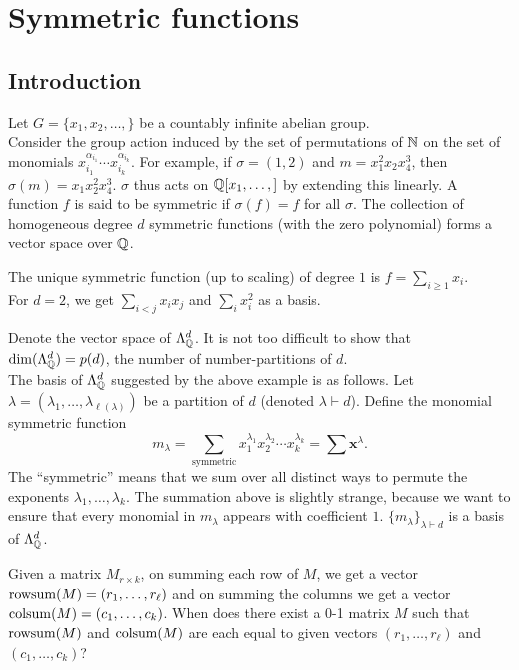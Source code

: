 \section{Symmetric functions}

\subsection{Introduction}

	Let $G = \{x_1,x_2,\ldots,\}$ be a countably infinite abelian group.\\ 
	Consider the group action induced by the set of permutations of $\mathbb{N}$ on the set of monomials $x_{i_1}^{\alpha_{i_1}}\cdots x_{i_k}^{\alpha_{i_k}}$. For example,
	if $\sigma = (1,2)$ and $m = x_1^2x_2x_4^3$, then $\sigma(m) = x_1x_2^2x_4^3$.
	$\sigma$ thus acts on $\mathbb{Q}[x_1,\ldots,]$ by extending this linearly. A function $f$ is said to be symmetric if $\sigma(f) = f$ for all $\sigma$. The collection of homogeneous degree $d$ symmetric functions (with the zero polynomial) forms a vector space over $\mathbb{Q}$.

	\begin{fex}
		The unique symmetric function (up to scaling) of degree $1$ is $f = \sum_{i \ge 1} x_i$.\\
		For $d=2$, we get $\sum_{i<j} x_ix_j$ and $\sum_i x_i^2$ as a basis.
	\end{fex}

	Denote the vector space of $\Lambda_{\mathbb{Q}}^d$. It is not too difficult to show that $\dim(\Lambda_{\mathbb{Q}}^d) = p(d)$, the number of number-partitions of $d$.\\
	The basis of $\Lambda_{\mathbb{Q}}^d$ suggested by the above example is as follows. Let $\lambda = (\lambda_1,\ldots,\lambda_{\ell(\lambda)})$ be a partition of $d$ (denoted $\lambda \vdash d$). Define the monomial symmetric function
	\[ m_\lambda = \sum_{\text{symmetric}} x_1^{\lambda_1} x_2^{\lambda_2} \cdots x_k^{\lambda_k} = \sum \textbf{x}^\lambda. \]
	The ``symmetric'' means that we sum over all distinct ways to permute the exponents $\lambda_1,\ldots,\lambda_k$. The summation above is slightly strange, because we want to ensure that every monomial in $m_\lambda$ appears with coefficient $1$. $\{m_\lambda\}_{\lambda \vdash d}$ is a basis of $\Lambda_{\mathbb{Q}}^d$.

	\begin{question}
		\label{question: rowsum colsum}
		Given a matrix $M_{r \times k}$, on summing each row of $M$, we get a vector $\operatorname{rowsum}(M) = (r_1,\ldots,r_\ell)$ and on summing the columns we get a vector $\operatorname{colsum}(M) = (c_1,\ldots,c_k)$. When does there exist a 0-1 matrix $M$ such that $\operatorname{rowsum}(M)$ and $\operatorname{colsum}(M)$ are each equal to given vectors $(r_1,\ldots,r_\ell)$ and $(c_1,\ldots,c_k)$?
	\end{question}

